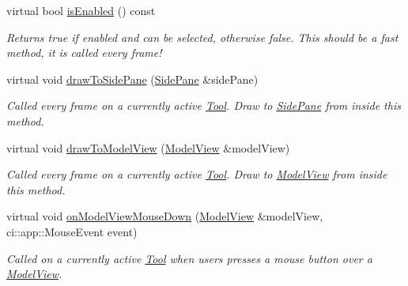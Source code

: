 \begin{DoxyCompactItemize}
\mbox{\label{classpepr3d_1_1_tool_aae323508b6d824047abc981e10a42c0f}} 
virtual bool \mbox{\hyperlink{classpepr3d_1_1_tool_aae323508b6d824047abc981e10a42c0f}{is\+Enabled}} () const
\begin{DoxyCompactList}\small\item\em Returns true if enabled and can be selected, otherwise false. This should be a fast method, it is called every frame! \end{DoxyCompactList}\item 
\mbox{\label{classpepr3d_1_1_tool_a07eac1be4dee577eec8c865390e8277d}} 
virtual void \mbox{\hyperlink{classpepr3d_1_1_tool_a07eac1be4dee577eec8c865390e8277d}{draw\+To\+Side\+Pane}} (\mbox{\hyperlink{classpepr3d_1_1_side_pane}{Side\+Pane}} \&side\+Pane)
\begin{DoxyCompactList}\small\item\em Called every frame on a currently active \mbox{\hyperlink{classpepr3d_1_1_tool}{Tool}}. Draw to \mbox{\hyperlink{classpepr3d_1_1_side_pane}{Side\+Pane}} from inside this method. \end{DoxyCompactList}\item 
\mbox{\label{classpepr3d_1_1_tool_a7278925cff7d0da94e54f9bca201bda7}} 
virtual void \mbox{\hyperlink{classpepr3d_1_1_tool_a7278925cff7d0da94e54f9bca201bda7}{draw\+To\+Model\+View}} (\mbox{\hyperlink{classpepr3d_1_1_model_view}{Model\+View}} \&model\+View)
\begin{DoxyCompactList}\small\item\em Called every frame on a currently active \mbox{\hyperlink{classpepr3d_1_1_tool}{Tool}}. Draw to \mbox{\hyperlink{classpepr3d_1_1_model_view}{Model\+View}} from inside this method. \end{DoxyCompactList}\item 
\mbox{\label{classpepr3d_1_1_tool_aaa49ecd05152b869571601c7741fc5ca}} 
virtual void \mbox{\hyperlink{classpepr3d_1_1_tool_aaa49ecd05152b869571601c7741fc5ca}{on\+Model\+View\+Mouse\+Down}} (\mbox{\hyperlink{classpepr3d_1_1_model_view}{Model\+View}} \&model\+View, ci\+::app\+::\+Mouse\+Event event)
\begin{DoxyCompactList}\small\item\em Called on a currently active \mbox{\hyperlink{classpepr3d_1_1_tool}{Tool}} when users presses a mouse button over a \mbox{\hyperlink{classpepr3d_1_1_model_view}{Model\+View}}. \end{DoxyCompactList}\item 

\end{DoxyCompactItemize}
